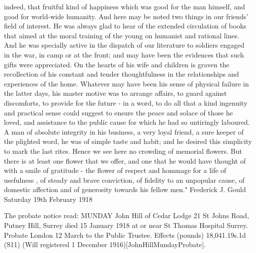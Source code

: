 indeed, that fruitful kind of happiness which was good for the man himself, and good for world-wide humanity. And here may be noted two things in our friends' field of interest. He was always glad to hear of the extended circulation of books that aimed at the moral training of the young on humanist and rational lines. And he was specially active in the dispatch of our literature to soldiers engaged in the war, in camp or at the front; and may have been the evidences that such gifts were appreciated.
    On the hearts of his wife and children is graven the recollection of his constant and tender thoughtfulness in the relationships and experiences of the home. Whatever may have been his sense of physical failure in the latter days, his master motive was to arrange affairs, to guard against discomforts, to provide for the future - in a word, to do all that a kind ingenuity and practical sense could suggest to ensure the peace and solace of those he loved, and assistance to the public cause for which he had so untiringly laboured. A man of absolute integrity in his business, a very loyal friend, a sure keeper of the plighted word, he was of simple taste and habit; and he desired this simplicity to mark the last rites. Hence we see here no crowding of memorial flowers. But there is at least one flower that we offer, and one that he would have thought of with a smile of gratitude - the flower of respect and hommage for a life of usefulness , of steady and brave conviction, of fidelity to an unpopular cause, of domestic affection and of generosity towards his fellow men."
    Frederick J. Gould
    Saturday 19th February 1918

The probate notice read:
MUNDAY John Hill of Cedar Lodge 21 St Johns Road, Putney Hill, Surrey died 15 January 1918 at or near St Thomas Hospital Surrey. Probate London 12 March to the Public Trustee. Effects (pounds) 18,041.19s.1d (S11) (Will registered 1 December 1916)[JohnHillMundayProbate].

	

